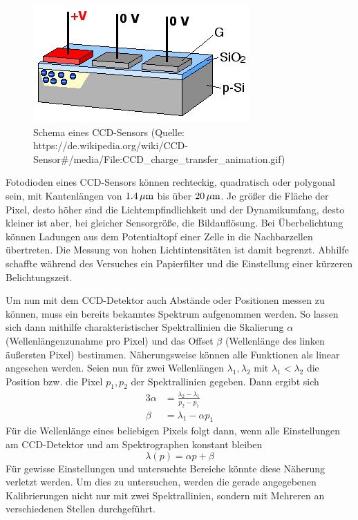		\begin{figure}
			\center
			\includegraphics[scale=0.8]{referenzen/CCD_charge_transfer_animation.jpg}
			\caption{Schema eines CCD-Sensors (Quelle:\\ https://de.wikipedia.org/wiki/CCD-Sensor\#/media/File:CCD\_charge\_transfer\_animation.gif)}
			\label{fig:schema-ccd}
		\end{figure}

		Fotodioden eines CCD-Sensors können rechteckig, quadratisch oder polygonal sein, mit Kantenlängen von $1.4\, \text{$\mu$m}$ bis über $20\, \text{$\mu$m}$.
		Je größer die Fläche der Pixel, desto höher sind die Lichtempfindlichkeit und der Dynamikumfang, desto kleiner ist aber, bei gleicher Sensorgröße, die Bildauflösung.
		Bei Überbelichtung können Ladungen aus dem Potentialtopf einer Zelle in die Nachbarzellen übertreten.
		Die Messung von hohen Lichtintensitäten ist damit begrenzt.
		Abhilfe schaffte während des Versuches ein Papierfilter und die Einstellung einer kürzeren Belichtungszeit.

		Um nun mit dem CCD-Detektor auch Abstände oder Positionen messen zu können, muss ein bereits bekanntes Spektrum aufgenommen werden.
		So lassen sich dann mithilfe charakteristischer Spektrallinien die Skalierung $\alpha$ (Wellenlängenzunahme pro Pixel) und das Offset $\beta$ (Wellenlänge des linken äußersten Pixel) bestimmen.
		Näherungsweise können alle Funktionen als linear angesehen werden.
		Seien nun für zwei Wellenlängen $\lambda_1, \lambda_2$ mit $\lambda_1 < \lambda_2$ die Position bzw. die Pixel $p_1,p_2$ der Spektrallinien gegeben.
		Dann ergibt sich
		\begin{alignat*}{3}
			\alpha &= \frac{\lambda_2 - \lambda_1}{p_2 - p_1} \\
			\beta &= \lambda_1 - \alpha p_1
		\end{alignat*}
		Für die Wellenlänge eines beliebigen Pixels folgt dann, wenn alle Einstellungen am CCD-Detektor und am Spektrographen konstant bleiben
		\[ \lambda(p) = \alpha p + \beta \]
		Für gewisse Einstellungen und untersuchte Bereiche könnte diese Näherung verletzt werden.
		Um dies zu untersuchen, werden die gerade angegebenen Kalibrierungen nicht nur mit zwei Spektrallinien, sondern mit Mehreren an verschiedenen Stellen durchgeführt.

